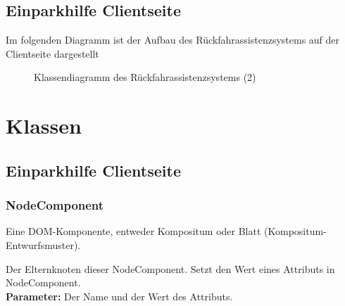 \documentclass[entwurf.tex]{subfiles}
\begin{document}
  	\section{Einparkhilfe Clientseite}
		Im folgenden Diagramm ist der Aufbau des Rückfahrassistenzsystems auf der Clientseite dargestellt
		\begin{figure}[H]
  			\caption{Klassendiagramm des Rückfahrassistenzsystems (2)}
  		\end{figure}
  	
  	
\chapter{Klassen}
		\section{Einparkhilfe Clientseite}
	\subsection{NodeComponent}
	\label{Abstract Class:NodeComponent}
		Eine DOM-Komponente, entweder Kompositum oder Blatt (Kompositum-Entwurfsmuster).
		\begin{description}
				Der Elternknoten dieser NodeComponent.
				Setzt den Wert eines Attributs in NodeComponent.\\
				\textbf{Parameter:} Der Name und der Wert des Attributs.\\
		\end{description}
		
\end{document}
